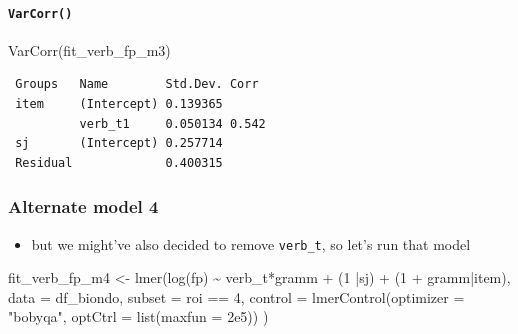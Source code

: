 \documentclass[
  letterpaper,
  DIV=11,
  numbers=noendperiod]{scrartcl}
\let\oldparagraph\paragraph
\renewcommand{\paragraph}[1]{\oldparagraph{#1}\mbox{}}
\newenvironment{Shaded}{\begin{snugshade}}{\end{snugshade}}
\newcommand{\AttributeTok}[1]{\textcolor[rgb]{0.40,0.45,0.13}{#1}}
\newcommand{\DecValTok}[1]{\textcolor[rgb]{0.68,0.00,0.00}{#1}}
\newcommand{\FloatTok}[1]{\textcolor[rgb]{0.68,0.00,0.00}{#1}}
\newcommand{\FunctionTok}[1]{\textcolor[rgb]{0.28,0.35,0.67}{#1}}
\newcommand{\NormalTok}[1]{\textcolor[rgb]{0.00,0.23,0.31}{#1}}
\newcommand{\OtherTok}[1]{\textcolor[rgb]{0.00,0.23,0.31}{#1}}
\newcommand{\SpecialCharTok}[1]{\textcolor[rgb]{0.37,0.37,0.37}{#1}}
\newcommand{\StringTok}[1]{\textcolor[rgb]{0.13,0.47,0.30}{#1}}
\providecommand{\tightlist}{%
  \setlength{\itemsep}{0pt}\setlength{\parskip}{0pt}}\usepackage{longtable,booktabs,array}
\begin{document}
\hypertarget{varcorr-2}{%
\paragraph{\texorpdfstring{\texttt{VarCorr()}}{VarCorr()}}\label{varcorr-2}}

\begin{Shaded}
\begin{Highlighting}[]
\FunctionTok{VarCorr}\NormalTok{(fit\_verb\_fp\_m3)}
\end{Highlighting}
\end{Shaded}

\begin{verbatim}
 Groups   Name        Std.Dev. Corr 
 item     (Intercept) 0.139365      
          verb_t1     0.050134 0.542
 sj       (Intercept) 0.257714      
 Residual             0.400315      
\end{verbatim}

\hypertarget{alternate-model-4}{%
\subsubsection{Alternate model 4}\label{alternate-model-4}}

\begin{itemize}
\tightlist
\item
  but we might've also decided to remove \texttt{verb\_t}, so let's run
  that model
\end{itemize}

\begin{Shaded}
\begin{Highlighting}[]
\NormalTok{fit\_verb\_fp\_m4 }\OtherTok{\textless{}{-}} \FunctionTok{lmer}\NormalTok{(}\FunctionTok{log}\NormalTok{(fp) }\SpecialCharTok{\textasciitilde{}}\NormalTok{ verb\_t}\SpecialCharTok{*}\NormalTok{gramm }\SpecialCharTok{+} 
\NormalTok{                      (}\DecValTok{1} \SpecialCharTok{|}\NormalTok{sj) }\SpecialCharTok{+}
\NormalTok{                      (}\DecValTok{1} \SpecialCharTok{+}\NormalTok{ gramm}\SpecialCharTok{|}\NormalTok{item),}
                    \AttributeTok{data =}\NormalTok{ df\_biondo,}
                    \AttributeTok{subset =}\NormalTok{ roi }\SpecialCharTok{==} \DecValTok{4}\NormalTok{,}
                    \AttributeTok{control =} \FunctionTok{lmerControl}\NormalTok{(}\AttributeTok{optimizer =} \StringTok{"bobyqa"}\NormalTok{,}
                                          \AttributeTok{optCtrl =} \FunctionTok{list}\NormalTok{(}\AttributeTok{maxfun =} \FloatTok{2e5}\NormalTok{))}
\NormalTok{)}
\end{Highlighting}
\end{Shaded}
\end{document}
